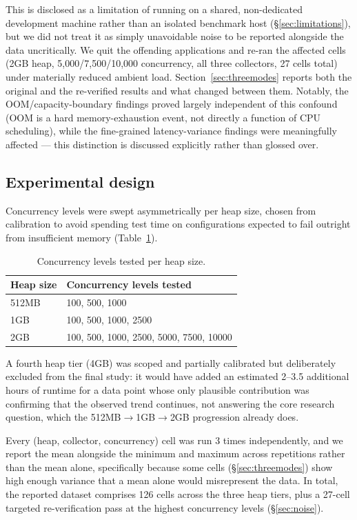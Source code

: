 \documentclass[11pt]{article}
\begin{document}
This is disclosed as a limitation of running on a shared, non-dedicated development machine
rather than an isolated benchmark host (\S\ref{sec:limitations}), but we did not treat it as
simply unavoidable noise to be reported alongside the data uncritically. We quit the offending
applications and re-ran the affected cells (2GB heap, 5{,}000/7{,}500/10{,}000 concurrency, all
three collectors, 27 cells total) under materially reduced ambient load.
Section~\ref{sec:threemodes} reports both the original and the re-verified results and what
changed between them. Notably, the OOM/capacity-boundary findings proved largely independent of
this confound (OOM is a hard memory-exhaustion event, not directly a function of CPU scheduling),
while the fine-grained latency-variance findings were meaningfully affected --- this distinction
is discussed explicitly rather than glossed over.

\subsection{Experimental design}

Concurrency levels were swept asymmetrically per heap size, chosen from calibration to avoid
spending test time on configurations expected to fail outright from insufficient memory
(Table~\ref{tab:sweep}).

\begin{table}[h]
\centering
\caption{Concurrency levels tested per heap size.}
\label{tab:sweep}
\begin{tabular}{ll}
\toprule
Heap size & Concurrency levels tested \\
\midrule
512MB & 100, 500, 1000 \\
1GB & 100, 500, 1000, 2500 \\
2GB & 100, 500, 1000, 2500, 5000, 7500, 10000 \\
\bottomrule
\end{tabular}
\end{table}

A fourth heap tier (4GB) was scoped and partially calibrated but deliberately excluded from the
final study: it would have added an estimated 2--3.5 additional hours of runtime for a data point
whose only plausible contribution was confirming that the observed trend continues, not
answering the core research question, which the 512MB$\to$1GB$\to$2GB progression already does.

Every (heap, collector, concurrency) cell was run 3 times independently, and we report the mean
alongside the minimum and maximum across repetitions rather than the mean alone, specifically
because some cells (\S\ref{sec:threemodes}) show high enough variance that a mean alone would
misrepresent the data. In total, the reported dataset comprises 126 cells across the three heap
tiers, plus a 27-cell targeted re-verification pass at the highest concurrency levels
(\S\ref{sec:noise}).
\end{document}
